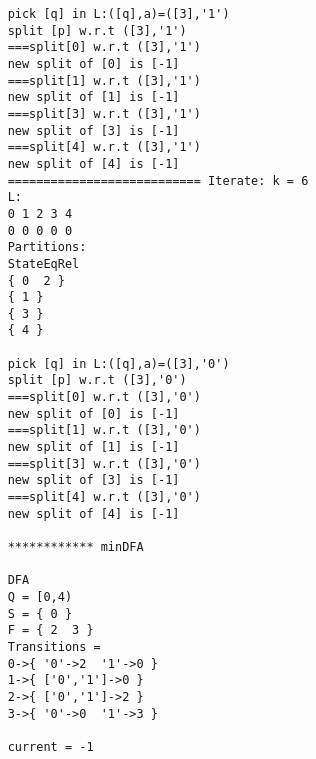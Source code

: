 \begin{lstlisting}
	pick [q] in L:([q],a)=([3],'1')
	split [p] w.r.t ([3],'1')
	===split[0] w.r.t ([3],'1')
	new split of [0] is [-1]
	===split[1] w.r.t ([3],'1')
	new split of [1] is [-1]
	===split[3] w.r.t ([3],'1')
	new split of [3] is [-1]
	===split[4] w.r.t ([3],'1')
	new split of [4] is [-1]
	=========================== Iterate: k = 6
	L:
	0 1 2 3 4
	0 0 0 0 0
	Partitions:
	StateEqRel
	{ 0  2 }
	{ 1 }
	{ 3 }
	{ 4 }
	
	pick [q] in L:([q],a)=([3],'0')
	split [p] w.r.t ([3],'0')
	===split[0] w.r.t ([3],'0')
	new split of [0] is [-1]
	===split[1] w.r.t ([3],'0')
	new split of [1] is [-1]
	===split[3] w.r.t ([3],'0')
	new split of [3] is [-1]
	===split[4] w.r.t ([3],'0')
	new split of [4] is [-1]
	
	************ minDFA
	
	DFA
	Q = [0,4)
	S = { 0 }
	F = { 2  3 }
	Transitions = 
	0->{ '0'->2  '1'->0 }
	1->{ ['0','1']->0 }
	2->{ ['0','1']->2 }
	3->{ '0'->0  '1'->3 }
	
	current = -1
	
\end{lstlisting}	


